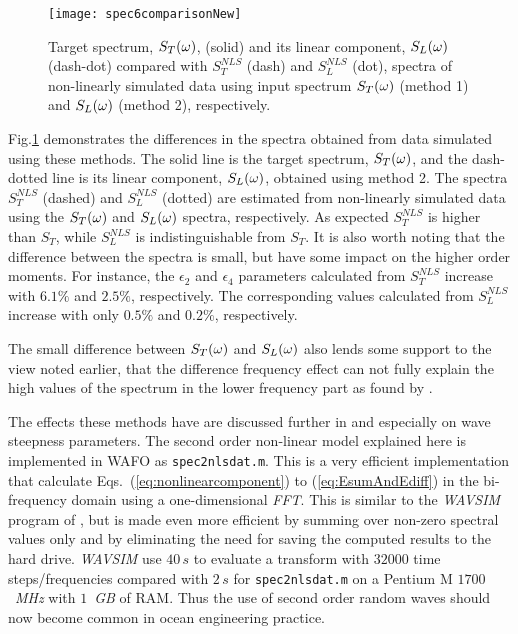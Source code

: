 \begin{figure}[tbh]
    \centering   \texttt{[image: spec6comparisonNew]} %
    \caption{Target spectrum, $S_{T}(\omega )$, (solid) and its linear
  component, $S_{L}(\omega )$ (dash-dot) compared with
$S_{T}^{NLS}$ (dash) and $S_{L}^{NLS}$ (dot), \ie{}
spectra of non-linearly simulated data using input
spectrum $S_{T}(\omega )$ (method 1) and
$S_{L}(\omega )$ (method 2), respectively.}
 \label{fig:spec6comparison} %
\end{figure}

Fig.\ref{fig:spec6comparison} demonstrates the differences in the
spectra obtained from data simulated using these methods. The solid
line is the target spectrum, $S_{T}(\omega )$, and the dash-dotted line is
its linear component, $S_{L}(\omega )$, obtained using
method 2.
The spectra $S_{T}^{NLS}$ (dashed) and
$S_{L}^{NLS}$ (dotted) are estimated from non-linearly simulated
data using the $S_{T}(\omega )$ and $S_{L}(\omega )$ spectra, respectively.
As expected $S_{T}^{NLS}$ is higher than
$S_{T}$, while  $S_{L}^{NLS}$ is indistinguishable from $S_{T}$.
It is also worth noting that the difference between the spectra is
small, but have some impact on the
higher order moments. For instance, the $\epsilon_{2}$ and  $\epsilon_{4}$ parameters
calculated from $S_{T}^{NLS}$ increase with $6.1\%$ and $2.5\%$,
respectively. The corresponding values calculated from $S_{L}^{NLS}$
increase with only  $0.5\%$ and $0.2\%$, respectively.

The small difference between  $S_{T}(\omega )$ and $S_{L}(\omega )$ also lends
some support to the view noted earlier, that
the difference frequency effect can not fully
explain the high values of the spectrum in the lower frequency part as
found by \cite{Wist2003Statistical}.

The effects these methods have are discussed further in
\cite{Brodtkorb2004Probability} and especially on  wave steepness
parameters. %
The second order non-linear model explained here
is implemented in WAFO
 as \verb+spec2nlsdat.m+.
This is a very efficient implementation that calculate
 Eqs.~(\ref{eq:nonlinearcomponent}) to (\ref{eq:EsumAndEdiff}) in the
 bi-frequency domain using a one-dimensional \textit{FFT}.
This is similar to the \textit{WAVSIM} program of
\cite{NestegardAndStokka1995Third}, but is made even more efficient
 by summing over non-zero spectral values only and by eliminating the
 need for saving the computed results to the hard drive.
\textit{WAVSIM} use $40\, s$ to evaluate a transform with
$32000$ time steps/frequencies compared with $2\, s$ for
\verb+spec2nlsdat.m+ on a Pentium M
$1700$~\textit{MHz} with $1$~\textit{GB} of RAM.
Thus the use of second order random waves should now become common in ocean
engineering practice.

